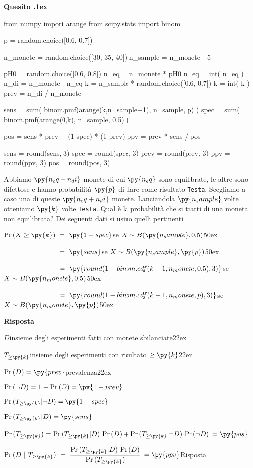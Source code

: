 \documentclass[11pt,twoside,a4paper]{article}
\def\Pr{{\rm Pr\,}}
\newcounter{quesito}
\newenvironment{question}{\bigskip\addtocounter{quesito}{1}\par\textbf{Quesito \thequesito.\kern1ex}}{\vspace{\parskip}}
\newenvironment{answer}{\par\textbf{Risposta\quad}}{\vspace{\parskip}}
\begin{document}
\begin{question}
\begin{pycode}
from numpy import arange
from scipy.stats import binom

p = random.choice([0.6, 0.7])

n_monete = random.choice([30, 35, 40])
n_sample = n_monete - 5

pH0 = random.choice([0.6, 0.8])
n_eq = n_monete * pH0
n_eq = int( n_eq )
n_di = n_monete - n_eq
k = n_sample * random.choice([0.6, 0.7])
k = int( k )
prev = n_di / n_monete


sens = sum( binom.pmf(arange(k,n_sample+1), n_sample, p) )
spec = sum( binom.pmf(arange(0,k), n_sample, 0.5) )

pos =  sens * prev + (1-spec) * (1-prev)
ppv =  prev * sens  / pos

sens = round(sens, 3)
spec = round(spec, 3)
prev = round(prev, 3)
ppv = round(ppv, 3)
pos = round(pos, 3)
\end{pycode}
Abbiamo $\py{n_eq+n_di}$ monete di cui $\py{n_eq}$ sono equilibrate, le altre sono difettose e hanno probabilità $\py{p}$ di dare come risultato {\tt Testa}. Scegliamo a caso una di queste $\py{n_eq+n_di}$ monete. Lanciandola $\py{n_sample}$ volte otteniamo $\py{k}$ volte {\tt Testa\/}. Qual è la probabilità che si tratti di una moneta non equilibrata? Dei seguenti dati si usino quelli pertinenti


$\Pr(X\ge \py{k})\ =\ \py{1-spec}$\hfill se $X\sim B(\py{n_sample},0.5)$\kern50ex

$\phantom{\Pr(X\ge \py{k})}\ =\ \py{sens}$\hfill se $X\sim B(\py{n_sample},\py{p})$\kern50ex

$\phantom{\Pr(X\ge \py{k})}\ =\ \py{round(1-binom.cdf(k-1, n_monete,0.5), 3)}$\hfill se $X\sim B(\py{n_monete},0.5)$\kern50ex

$\phantom{\Pr(X\ge \py{k})}\ =\ \py{round(1-binom.cdf(k-1, n_monete,  p), 3)}$\hfill se $X\sim B(\py{n_monete},\py{p})$\kern50ex


\begin{answer}

$D$\hfill insieme degli esperimenti fatti con monete sbilanciate\kern22ex

$T_{\ge\py{k}}$\hfill insieme degli esperimenti con risultato $\ge\py{k}$\kern22ex

$\Pr(D)=\py{prev}$\hfill prevalenza\kern22ex

$\Pr(\neg D)=1-\Pr(D)=\py{1-prev}$

$\Pr(T_{\ge\py{k}}| \neg D)=\py{1-spec}$

$\Pr(T_{\ge\py{k}}| D)=\py{sens}$

$\Pr(T_{\ge\py{k}})=\Pr(T_{\ge\py{k}}|D)\ \Pr(D) + \Pr(T_{\ge\py{k}}|\neg D)\ \Pr(\neg D)$ {\color{blue} $=\py{pos}$}

$\displaystyle\Pr(D ~|~T_{\ge\py{k}})\ =\ \frac{\Pr(T_{\ge\py{k}}|D)\ \Pr(D)}{\Pr(T_{\ge\py{k}})}$ {\color{blue} $=\py{ppv}$\hfill Risposta}

\end{answer}
\end{question}
\end{document}
